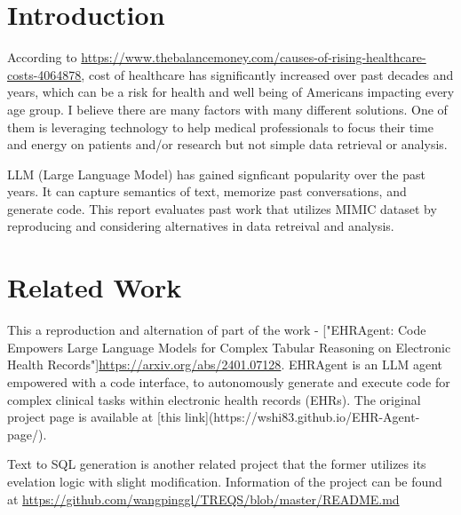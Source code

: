 \documentclass[screen,review]{acmart}
\begin{document}
\maketitle

\section{Introduction}
According to \url{https://www.thebalancemoney.com/causes-of-rising-healthcare-costs-4064878}, 
cost of healthcare has significantly increased over past decades and years, which can be a 
risk for health and well being of Americans impacting every age group. I believe there 
are many factors with many different solutions. One of them is leveraging technology 
to help medical professionals to focus their time and energy on patients and/or research 
but not simple data retrieval or analysis.

LLM (Large Language Model) has gained signficant popularity over the past years. It can 
capture semantics of text, memorize past conversations, and generate code. This report 
evaluates past work that utilizes MIMIC\cite{PhysioBank_PhysioToolkit_PhysioNet}\cite{physioNet}\cite{Johnson2016}
dataset by reproducing and considering alternatives in data retreival and analysis.

\section{Related Work}
This a reproduction and alternation of part of the work - ["EHRAgent: Code Empowers Large Language Models 
for Complex Tabular Reasoning on Electronic Health Records"]\url{https://arxiv.org/abs/2401.07128}. 
EHRAgent is an LLM agent empowered with a code interface, to autonomously generate and 
execute code for complex clinical tasks within electronic health records (EHRs). 
The original project page is available at [this link](https://wshi83.github.io/EHR-Agent-page/). \cite{shi2024ehragent}

Text to SQL generation is another related project that the former utilizes its evelation logic 
with slight modification. Information of the project can be found at
\url{https://github.com/wangpinggl/TREQS/blob/master/README.md} \cite{wang2020text}
\end{document}
